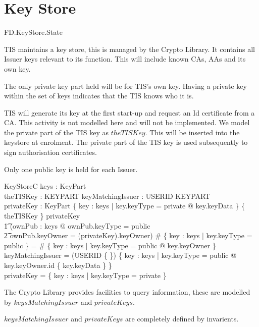 \section{Key Store}

\begin{traceunit}{FD.KeyStore.State}
\end{traceunit}


TIS maintains a key store, this is managed by the Crypto Library. 
It contains all Issuer keys relevant to
its function. This will include known CAs, AAs and its own key. 

The only private key part held will be for TIS's own key. Having a
private key within the set of keys indicates that the TIS knows who it is.

TIS will generate its key at the first start-up and request an Id
certificate from a CA. This activity is not modelled here and will not
be implemented. We model the private part of the TIS key as
$theTISKey$. This will be inserted into the keystore at enrolment. The
private part of the TIS key is used subsequently to sign authorisation
certificates.  

Only one public key is held for each Issuer.

\begin{schema}{KeyStoreC}
        keys : \finset KeyPart
\\      theTISKey : KEYPART
\also
        keyMatchingIssuer : USERID \fun \Optional KEYPART 
\\      privateKey : \Optional KeyPart
\where
        \{ key : keys | key.keyType = private @ key.keyData \}
\subseteq \{ theTISKey \}         
\also
        privateKey \neq \Nil  \implies 
\\ \t1  (\exists ownPub : keys @ ownPub.keyType = public 
\\ \t2          \land ownPub.keyOwner = (\The privateKey).keyOwner)
\also
        \# \{ key : keys | key.keyType = public \} =
        \# \{ key : keys | key.keyType = public @ key.keyOwner \}
\also
        keyMatchingIssuer = (USERID \cross \{ \emptyset \})
        \oplus \{ key : keys | key.keyType = public @  key.keyOwner.id
        \mapsto \{ key.keyData \} \}   
\\
        privateKey = \{ key : keys | key.keyType = private \}      
\end{schema}
\begin{Zcomment}
\item
The Crypto Library provides facilities to query information, these are
modelled by $keysMatchingIssuer$ and $privateKeys$.
\item
$keysMatchingIssuer$ and $privateKeys$ are completely defined by invarients.
\end{Zcomment}

